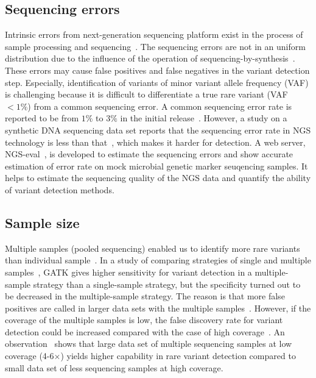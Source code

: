 \documentclass[a4,center,fleqn]{NAR}
\begin{document}
\subsection{Sequencing errors}

Intrinsic errors from next-generation sequencing platform exist in the process of sample processing and sequencing~\citep{Olson2015}.
The sequencing errors are not in an uniform distribution due to the influence of the operation of sequencing-by-synthesis~\citep{nakamura2011sequence, mamanova2010target}.
These errors may cause false positives and false negatives in the variant detection step.
Especially, identification of variants of minor variant allele frequency (VAF) is challenging because it is difficult to differentiate a true rare variant (VAF $<1\%$) from a common sequencing error.
A common sequencing error rate is reported to be from $1\%$ to $3\%$ in the initial release~\citep{shendure2008next}.
However, a study on a synthetic DNA sequencing data set reports that the sequencing error rate in NGS technology is less than that~\citep{Flaherty2012}, which makes it harder for detection.
A web server, NGS-eval~\citep{may2015ngs}, is developed to estimate the sequencing errors and show accurate estimation of error rate on mock microbial genetic marker seuqencing samples.
It helps to estimate the sequencing quality of the NGS data and quantify the ability of variant detection methods.



\subsection{Sample size}

Multiple samples (pooled sequencing) enabled us to identify more rare variants than individual sample~\citep{Bao2014, liu2012steps}.
In a study of comparing strategies of single and multiple samples~\citep{liu2013variant}, GATK gives higher sensitivity for variant detection in a multiple-sample strategy than a single-sample strategy, but the specificity turned out to be decreased in the multiple-sample strategy.
The reason is that more false positives are called in larger data sets with the multiple samples~\citep{Nielsen2011}.
However, if the coverage of the multiple samples is low, the false discovery rate for variant detection could be increased compared with the case of high coverage~\citep{Cheng2014}.
An observation~\citep{le2011snp} shows that large data set of multiple sequencing samples at low coverage (4-6$\times$) yields higher capability in rare variant detection compared to small data set of less sequencing samples at high coverage.
\end{document}

